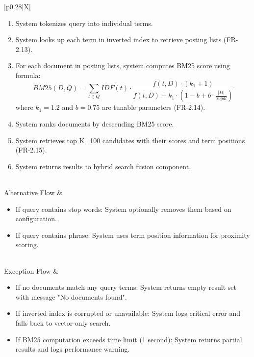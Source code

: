 \begin{minipage}{\textwidth}
\begin{tabularx}{\textwidth}{|p{0.28\textwidth}|X|}
{\begin{enumerate}
            \item System tokenizes query into individual terms.
            \item System looks up each term in inverted index to retrieve posting lists (FR-2.13).
            \item For each document in posting lists, system computes BM25 score using formula:
            $$BM25(D,Q) = \sum_{t \in Q} IDF(t) \cdot \frac{f(t,D) \cdot (k_1 + 1)}{f(t,D) + k_1 \cdot (1 - b + b \cdot \frac{|D|}{avgdl})}$$
            where $k_1=1.2$ and $b=0.75$ are tunable parameters (FR-2.14).
            \item System ranks documents by descending BM25 score.
            \item System retrieves top K=100 candidates with their scores and term positions (FR-2.15).
            \item System returns results to hybrid search fusion component.
        \end{enumerate}%
        } \\
    \hline
    Alternative Flow &
        \parbox[t]{\linewidth}{%
        \begin{itemize}
            \item If query contains stop words: System optionally removes them based on configuration.
            \item If query contains phrase: System uses term position information for proximity scoring.
        \end{itemize}%
        } \\
    \hline
    Exception Flow &
        \parbox[t]{\linewidth}{%
        \begin{itemize}
            \item If no documents match any query terms: System returns empty result set with message "No documents found".
            \item If inverted index is corrupted or unavailable: System logs critical error and falls back to vector-only search.
            \item If BM25 computation exceeds time limit (1 second): System returns partial results and logs performance warning.
        \end{itemize}%
        } \\
    \hline
\end{tabularx}
\end{minipage}
\bigskip


